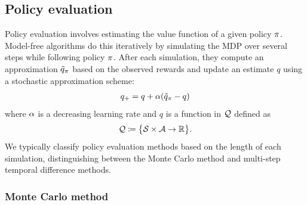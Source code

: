 \subsection{Policy evaluation}

Policy evaluation involves estimating the value function of a given policy $\pi$.
Model-free algorithms do this iteratively by simulating the MDP over several steps while following policy $\pi$. After each simulation, they compute an approximation $\Tilde{q}_\pi$ based on the observed rewards and update an estimate $q$ using a stochastic approximation scheme:
\begin{align}
    q_+ = q + \alpha ( \Tilde{q}_\pi - q )
\end{align}
where $\alpha$ is a decreasing learning rate
and $q$ is a function in $\mathcal{Q}$ defined as
\begin{align}
    \mathcal{Q} \coloneqq \big\{ \mathcal{S} \times \mathcal{A} \to \mathbb{R} \big\} .
\end{align}
We typically classify policy evaluation methods based on the length of each simulation, distinguishing between the Monte Carlo method and multi-step temporal difference methods.






\subsubsection{Monte Carlo method}

